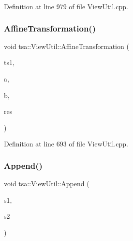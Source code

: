 Definition at line 979 of file View\+Util.\+cpp.

\mbox{\label{classtsa_1_1_view_util_a41ec224b9de8ca38affb8a83589c93c7}} 
\subsubsection{\texorpdfstring{Affine\+Transformation()}{AffineTransformation()}}
{\footnotesize\ttfamily void tsa\+::\+View\+Util\+::\+Affine\+Transformation (\begin{DoxyParamCaption}\item[{\hyperlink{namespacetsa_ac599574bcc094eda25613724b8f3ca9e}{Seq\+View\+Double} \&}]{ts1,  }\item[{double}]{a,  }\item[{double}]{b,  }\item[{\hyperlink{namespacetsa_ac599574bcc094eda25613724b8f3ca9e}{Seq\+View\+Double} \&}]{res }\end{DoxyParamCaption})\hspace{0.3cm}{\ttfamily [static]}}



Definition at line 693 of file View\+Util.\+cpp.

\mbox{\label{classtsa_1_1_view_util_aef8807df1cb1fd091da9b13242a7f273}} 
\subsubsection{\texorpdfstring{Append()}{Append()}}
{\footnotesize\ttfamily void tsa\+::\+View\+Util\+::\+Append (\begin{DoxyParamCaption}\item[{\hyperlink{namespacetsa_ac599574bcc094eda25613724b8f3ca9e}{Seq\+View\+Double} \&}]{s1,  }\item[{\hyperlink{namespacetsa_ac599574bcc094eda25613724b8f3ca9e}{Seq\+View\+Double} \&}]{s2 }\end{DoxyParamCaption})\hspace{0.3cm}{\ttfamily [static]}}




